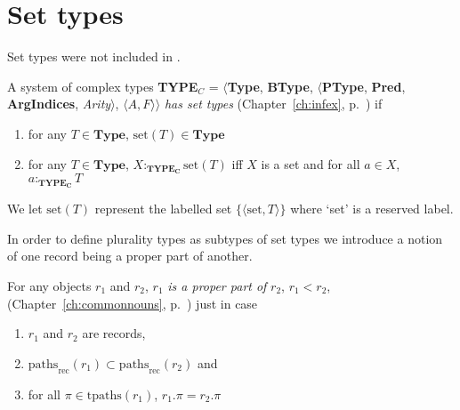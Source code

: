 \section{Set types}
\label{app:settypes}

Set types were not included in \cite{Cooper2012}.

A system of complex types {\bf TYPE$_C$} = $\langle${\bf Type}, {\bf BType},
$\langle$\textbf{PType}, {\bf Pred}, \textbf{ArgIndices}, {\it
  Arity\/}$\rangle$, $\langle A,F\rangle$$\rangle$ \textit{has set
  types} (Chapter~\ref{ch:infex}, p.~\pageref{ex:settypes}) if
\begin{enumerate} 
 
\item for any $T \in \textbf{Type}$, $\mathrm{set}(T) \in \textbf{Type}$ 
 
\item for any $T \in \textbf{Type}$, 
$X:_{\mathbf{TYPE_C}}\mathrm{set}(T)$ iff  $X$ is a set and 
  for all $a\in X$, $a:_{\mathbf{TYPE_C}}T$
   
 
\end{enumerate}

We let $\mathrm{set}(T)$ represent the labelled set
$\{\langle\mathrm{set},T\rangle\}$ where `set' is a reserved
label.

 

In order to define plurality types as subtypes of set types we
introduce a notion of one record being a proper part of another.

For any objects $r_1$ and $r_2$, $r_1$ \textit{is a proper
    part of} $r_2$, $r_1<r_2$, (Chapter~\ref{ch:commonnouns},
  p.~\pageref{ex:properpart}) just in case
  \begin{enumerate}
  \item $r_1$ and $r_2$ are records, 
  \item
    $\mathrm{paths}_{\text{rec}}(r_1)\subset\mathrm{paths}_{\text{rec}}(r_2)$
      and
    \item for all $\pi\in\mathrm{tpaths}(r_1)$, $r_1.\pi=r_2.\pi$
    \end{enumerate} 

